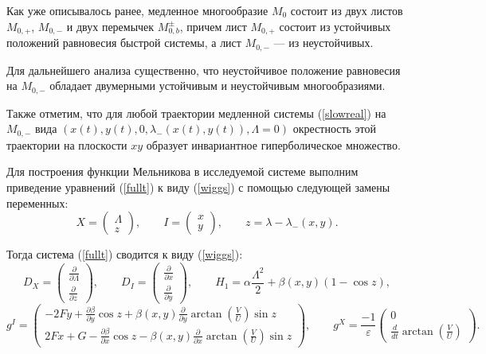 Как уже описывалось ранее, медленное многообразие $M_0$ состоит из двух листов $M_{0,+}$, $M_{0,-}$ и двух перемычек $M_{0,b}^{\pm}$, причем лист $M_{0,+}$ состоит из устойчивых положений равновесия быстрой системы, а лист $M_{0,-}$ — из неустойчивых.

Для дальнейшего анализа существенно, что неустойчивое положение равновесия на $M_{0,-}$ обладает двумерными устойчивым и неустойчивым многообразиями.

Также отметим, что для любой траектории медленной системы (\ref{slowreal}) на $M_{0,-}$ вида $\left( x(t), y(t), 0, \lambda_{-} \left( x(t),y(t) \right), \Lambda = 0 \right)$ окрестность этой траектории на плоскости $xy$ образует инвариантное гиперболическое множество.

Для построения функции Мельникова в исследуемой системе выполним приведение уравнений (\ref{fullt}) к виду (\ref{wiggs}) с помощью следующей замены переменных:
$$
X = \begin{pmatrix}
\Lambda\\
z
\end{pmatrix}, \qquad
I = \begin{pmatrix}
x\\
y
\end{pmatrix},
\qquad
z = \lambda - \lambda_{-}(x,y).$$ 

Тогда система (\ref{fullt}) сводится к виду (\ref{wiggs}):
$$
D_X = \begin{pmatrix}
\frac{\partial}{\partial \Lambda}\\
\frac{\partial}{\partial z}
\end{pmatrix}, \qquad
D_I = \begin{pmatrix}
\frac{\partial}{\partial x}\\
\frac{\partial}{\partial y}
\end{pmatrix},
\qquad
H_1 = \alpha \frac{\Lambda^2}{2} + \beta(x,y)(1 - \cos z),$$
$$g^I = \begin{pmatrix}
-2Fy + \frac{\partial \beta}{\partial y} \cos z + \beta(x,y) \frac{\partial}{\partial y} \arctan\left(\frac{V}{U}\right) \sin z \\
2Fx + G - \frac{\partial \beta}{\partial x} \cos z - \beta(x,y) \frac{\partial}{\partial x} \arctan\left(\frac{V}{U}\right) \sin z
\end{pmatrix}, \qquad g^X = \frac{-1}{\varepsilon} \begin{pmatrix}
0 \\
\frac{d}{dt} \arctan\left(\frac{V}{U}\right)
\end{pmatrix}.$$

